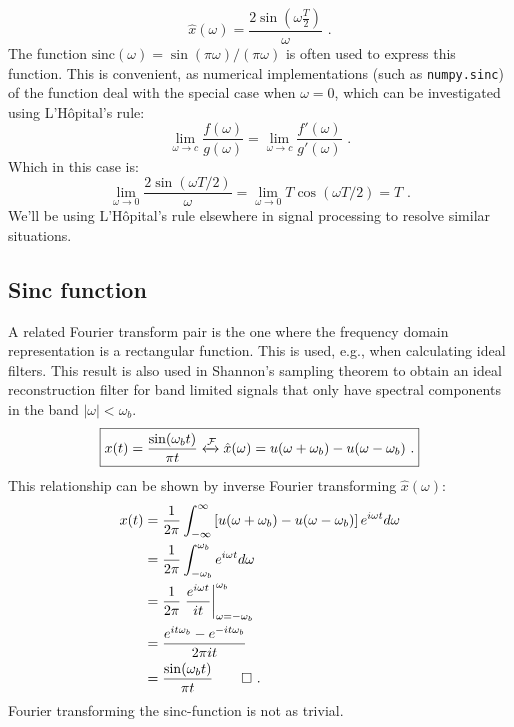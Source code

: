 \begin{equation}
\boxed{
\hat{x}(\omega) = \frac{2\sin(\omega \frac{T}{2})}{\omega}\,\,.
}
\end{equation}
The function $\mathrm{sinc}(\omega)=\sin(\pi\omega)/(\pi\omega)$ is often used to express this function. This is convenient, as numerical implementations (such as \verb|numpy.sinc|) of the function deal with the special case when $\omega=0$, which can be investigated using L'H\^{o}pital's rule:
\begin{equation}
\lim_{\omega \rightarrow c} \frac{f(\omega)}{g(\omega)} = \lim_{\omega \rightarrow c} \frac{f'(\omega)}{g'(\omega)}\,\,.
\end{equation}
Which in this case is:
\begin{equation}
\lim_{\omega \rightarrow 0} \frac{2\sin(\omega T/2)}{\omega} = \lim_{\omega \rightarrow 0} T\cos(\omega T/2 ) = T\,\,.
\end{equation}
We'll be using L'H\^{o}pital's rule elsewhere in signal processing to resolve similar situations.

\subsection{Sinc function}
A related Fourier transform pair is the one where the frequency domain representation is a rectangular function. This is used, e.g., when calculating ideal filters. 
This result is also used in Shannon's sampling theorem to obtain an ideal reconstruction filter for band limited signals that only have spectral components in the band
$|\omega| < \omega_b$.
\begin{equation}
\boxed{
x(t) = \frac{\sin(\omega_b t)}{\pi t} \xleftrightarrow{\mathcal{F}} \hat{x}(\omega) = u(\omega+\omega_b) - u(\omega-\omega_b)\,\,.
}
\label{eq:ft:sinc}
\end{equation}
This relationship can be shown by inverse Fourier transforming $\hat{x}(\omega)$:
\begin{align}
x(t) &= \frac{1}{2\pi}\int_{-\infty}^{\infty} \left[u(\omega+\omega_b) - u(\omega-\omega_b)\right] e^{i\omega t}d\omega \\
 &= \frac{1}{2\pi}\int_{-\omega_b}^{\omega_b} e^{i\omega t}d\omega \\
 &= \frac{1}{2\pi}\left.\frac{e^{i\omega t}}{it}\right|_{\omega=-\omega_b}^{\omega_b} \\
 &= \frac{e^{i t \omega_b} - e^{-i t \omega_b} }{ 2\pi i t} \\
 &= \frac{\sin(\omega_b t)}{\pi t}\qed\,\,.
\end{align}
Fourier transforming the sinc-function is not as trivial.

